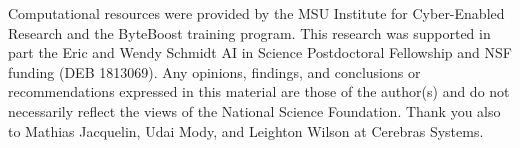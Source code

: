 \begin{acks}
Computational resources were provided by the MSU Institute for Cyber-Enabled Research and the ByteBoost training program.
This research was supported in part the Eric and Wendy Schmidt AI in Science Postdoctoral Fellowship and NSF funding (DEB 1813069).
Any opinions, findings, and conclusions or recommendations expressed in this material are those of the author(s) and do not necessarily reflect the views of the National Science Foundation.
Thank you also to Mathias Jacquelin, Udai Mody, and Leighton Wilson at Cerebras Systems.
\end{acks}
